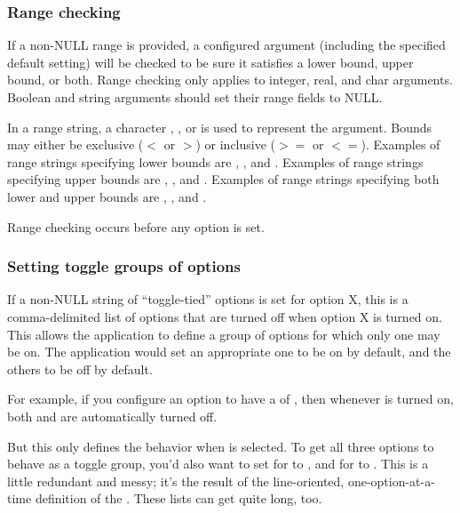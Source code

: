    \subsubsection{Range checking}

If a non-NULL range is provided, a configured argument (including the
specified default setting) will be checked to be sure it satisfies a
lower bound, upper bound, or both. Range checking only applies to
integer, real, and char arguments. Boolean and string arguments should
set their range fields to NULL.

In a range string, a character , , or  is
used to represent the argument. Bounds may either be exclusive ($<$ or
$>$) or inclusive ($>=$ or $<=$). Examples of range strings specifying
lower bounds are , , and
. Examples of range strings specifying upper bounds are
, , and . Examples of
range strings specifying both lower and upper bounds are
, , and .

Range checking occurs before any option is set.



   \subsubsection{Setting toggle groups of options}

If a non-NULL string  of ``toggle-tied'' options
is set for option X, this is a comma-delimited list of options that
are turned off when option X is turned on. This allows the application
to define a group of options for which only one may be on. The
application would set an appropriate one to be on by default, and the
others to be off by default.

For example, if you configure an option  to have a
 of , then whenever  is
turned on, both  and  are automatically turned
off. 

But this only defines the behavior when  is selected.  To
get all three options to behave as a toggle group, you'd also want to
set  for  to , and
 for  to . This is a
little redundant and messy; it's the result of the line-oriented,
one-option-at-a-time definition of the .  These
lists can get quite long, too.

